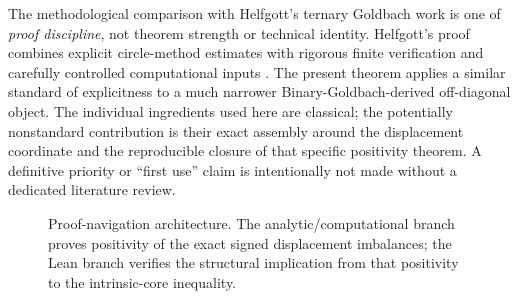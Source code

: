 \documentclass[11pt]{article}
\theoremstyle{definition}
\newcommand{\RR}{Ramar\'{e}--Rumely}
\begin{document}
The methodological comparison with Helfgott's ternary Goldbach work is one of \emph{proof discipline}, not theorem strength or technical identity. Helfgott's proof combines explicit circle-method estimates with rigorous finite verification and carefully controlled computational inputs \cite{HelfgottMajor2013,HelfgottPlatt2013,Helfgott2015}. The present theorem applies a similar standard of explicitness to a much narrower Binary-Goldbach-derived off-diagonal object. The individual ingredients used here are classical; the potentially nonstandard contribution is their exact assembly around the displacement coordinate and the reproducible closure of that specific positivity theorem. A definitive priority or ``first use'' claim is intentionally not made without a dedicated literature review.

\begin{figure}[H]
\centering
{}
\caption{Proof-navigation architecture. The analytic/computational branch proves positivity of the exact signed displacement imbalances; the Lean branch verifies the structural implication from that positivity to the intrinsic-core inequality.}
\label{fig:architecture}
\end{figure}
\end{document}
